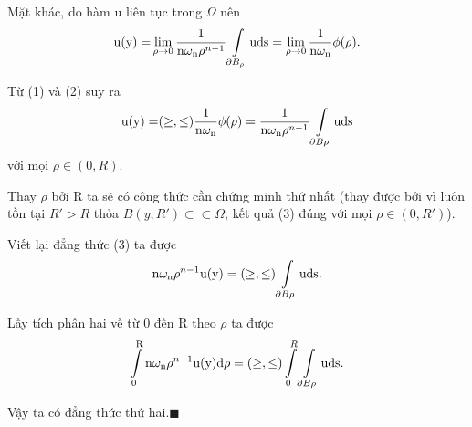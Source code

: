Mặt khác, do hàm u liên tục trong $\Omega$ nên
\begin{equation}
{\rm{u(y) = }}\mathop {{\rm{lim}}}\limits_{\rho  \to {\rm{0}}} \frac{{\rm{1}}}{{{\rm{n}}\omega _{\rm{n}} \rho ^{n - 1} }}\int\limits_{\partial B_\rho  } {{\rm{uds}}}  = \mathop {{\rm{lim}}}\limits_{\rho  \to {\rm{0}}} \frac{{\rm{1}}}{{{\rm{n}}\omega _{\rm{n}} }}\phi (\rho ).
\end{equation}

Từ (1) và (2) suy ra
\begin{equation}
{\rm{u(y) = }}( \ge , \le )\frac{{\rm{1}}}{{{\rm{n}}\omega _{\rm{n}} }}\phi (\rho ) = \frac{{\rm{1}}}{{{\rm{n}}\omega _{\rm{n}} \rho ^{n - 1} }}\int\limits_{\partial B\rho } {{\rm{uds}}}
\end{equation}
với mọi $\rho \in (0, R)$.

Thay $\rho$ bởi R ta sẽ có công thức cần chứng minh thứ nhất (thay được bởi vì luôn tồn tại $R' > R$ thỏa $ B(y,R') \subset  \subset \Omega $, kết quả (3) đúng với mọi $\rho \in (0, R')$).

Viết lại đẳng thức (3) ta được 
\[
{\rm{n}}\omega _{\rm{n}} \rho ^{n - 1} {\rm{u(y)}} = ( \ge , \le )\int\limits_{\partial B\rho } {{\rm{uds}}} .
\]

Lấy tích phân hai vế từ 0 đến R theo $\rho$ ta được 
\[
\int\limits_{\rm{0}}^{\rm{R}} {{\rm{n}}\omega _{\rm{n}} \rho ^{n - 1} {\rm{u(y)d}}\rho }  = ( \ge , \le )\int\limits_0^R {\int\limits_{\partial B\rho } {{\rm{uds}}} }. 
\]

Vậy ta có đẳng thức thứ hai.$\blacksquare$
